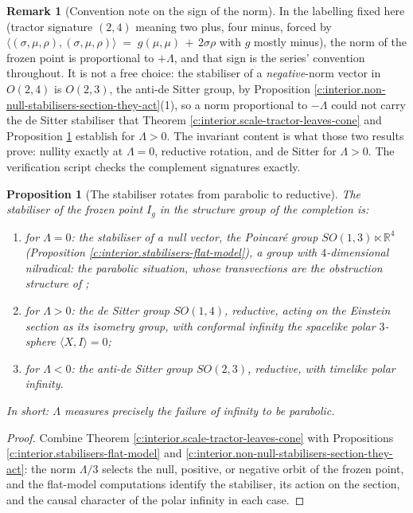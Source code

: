 \documentclass[11pt]{article}
\newtheorem{proposition}[theorem]{Proposition}
\theoremstyle{definition}
\newtheorem{remark}[theorem]{Remark}
\theoremstyle{plain}
\providecommand{\R}{}\renewcommand{\R}{\mathbb{R}}
\providecommand{\ip}{}\renewcommand{\ip}[2]{\langle #1, #2\rangle}
\begin{document}
\begin{remark}[Convention note on the sign of the norm]\label{c:note.interior.convention-note-sign-norm}
In the labelling fixed here (tractor signature $(2,4)$ meaning two plus, four minus, forced by $\ip{(\sigma,\mu,\rho)}{(\sigma,\mu,\rho)} \;=\; g(\mu,\mu) \,+\, 2\sigma\rho$ with $g$ mostly minus), the norm of the frozen point is proportional to $+\Lambda$, and that sign is the series' convention throughout. It is not a free choice: the stabiliser of a \emph{negative}-norm vector in $O(2,4)$ is $O(2,3)$, the anti-de Sitter group, by Proposition \ref{c:interior.non-null-stabilisers-section-they-act}(1), so a norm proportional to $-\Lambda$ could not carry the de Sitter stabiliser that Theorem \ref{c:interior.scale-tractor-leaves-cone} and Proposition \ref{c:interior.stabiliser-rotates-parabolic-reductive} establish for $\Lambda > 0$. The invariant content is what those two results prove: nullity exactly at $\Lambda = 0$, reductive rotation, and de Sitter for $\Lambda > 0$. The verification script checks the complement signatures exactly.
\end{remark}

\begin{proposition}[The stabiliser rotates from parabolic to reductive]\label{c:interior.stabiliser-rotates-parabolic-reductive}
The stabiliser of the frozen point $I_g$ in the structure group of the completion is:
\begin{enumerate}
\item for $\Lambda = 0$: the stabiliser of a null vector, the Poincar\'e group $SO(1,3) \ltimes \R^4$ (Proposition \ref{c:interior.stabilisers-flat-model}), a group with $4$-dimensional nilradical: the parabolic situation, whose transvections are the obstruction structure of \cite{ButlerT1};
\item for $\Lambda > 0$: the de Sitter group $SO(1,4)$, reductive, acting on the Einstein section as its isometry group, with conformal infinity the spacelike polar $3$-sphere $\ip{X}{I} = 0$;
\item for $\Lambda < 0$: the anti-de Sitter group $SO(2,3)$, reductive, with timelike polar infinity.
\end{enumerate}
In short: $\Lambda$ measures precisely the failure of infinity to be parabolic.
\end{proposition}
\begin{proof}
Combine Theorem \ref{c:interior.scale-tractor-leaves-cone} with Propositions \ref{c:interior.stabilisers-flat-model} and \ref{c:interior.non-null-stabilisers-section-they-act}: the norm $\Lambda/3$ selects the null, positive, or negative orbit of the frozen point, and the flat-model computations identify the stabiliser, its action on the section, and the causal character of the polar infinity in each case.

\end{proof}
\end{document}
